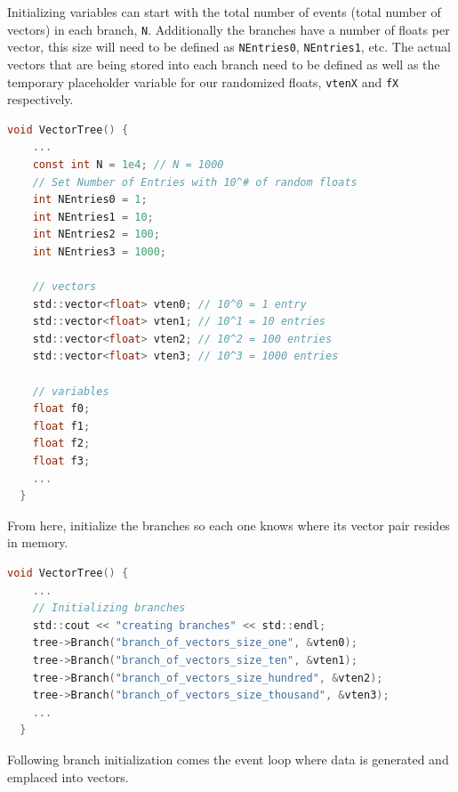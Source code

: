 Initializing variables can start with the total number of events (total number of vectors) in each branch, \verb|N|. 
Additionally the branches have a number of floats per vector, this size will need to be defined as \verb|NEntries0|, \verb|NEntries1|, etc.  
The actual vectors that are being stored into each branch need to be defined as well as the temporary placeholder variable for our randomized floats, \verb|vtenX| and \verb|fX| respectively. 
\begin{lstlisting}[language=C]  
  void VectorTree() {
    ...
    const int N = 1e4; // N = 1000
    // Set Number of Entries with 10^# of random floats
    int NEntries0 = 1;
    int NEntries1 = 10;
    int NEntries2 = 100;
    int NEntries3 = 1000;

    // vectors
    std::vector<float> vten0; // 10^0 = 1 entry
    std::vector<float> vten1; // 10^1 = 10 entries
    std::vector<float> vten2; // 10^2 = 100 entries
    std::vector<float> vten3; // 10^3 = 1000 entries

    // variables
    float f0;
    float f1;
    float f2;
    float f3;
    ...
  }
\end{lstlisting}

From here, initialize the branches so each one knows where its vector pair resides in memory.
\begin{lstlisting}[language=C]  
  void VectorTree() {
    ...
    // Initializing branches
    std::cout << "creating branches" << std::endl;
    tree->Branch("branch_of_vectors_size_one", &vten0);
    tree->Branch("branch_of_vectors_size_ten", &vten1);
    tree->Branch("branch_of_vectors_size_hundred", &vten2);
    tree->Branch("branch_of_vectors_size_thousand", &vten3);
    ...
  }
\end{lstlisting}

Following branch initialization comes the event loop where data is generated and emplaced into vectors.

